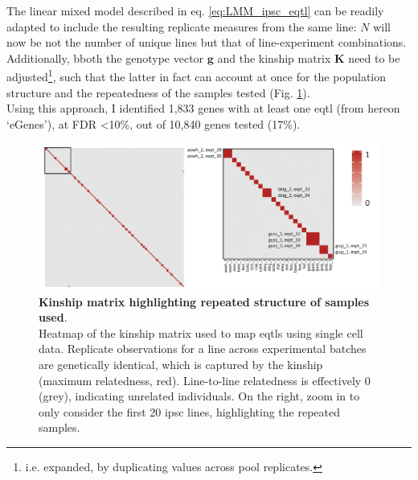 
The linear mixed model described in eq. \eqref{eq:LMM_ipsc_eqtl} can be readily adapted to include the resulting replicate measures from the same line: $N$ will now be not the number of unique lines but that of line-experiment combinations.
Additionally, bboth the genotype vector $\mathbf{g}$ and the kinship matrix $\mathbf{K}$ need to be adjusted\footnote{i.e. expanded, by duplicating values across pool replicates.}, such that the latter in fact can account at once for the population structure and the repeatedness of the samples tested (Fig. \ref{fig:kinship_repeats}). \\

Using this approach, I identified 1,833 genes with at least one \gls{eqtl} (from hereon `eGenes'), at FDR <10\%, out of 10,840 genes tested (17\%). 

\begin{figure}[h]
\centering
\includegraphics[width=14.5cm]{Chapter3/Fig/kinship_repeatedness.png}
\caption[Kinship for repeated samples]{\textbf{Kinship matrix highlighting repeated structure of samples used}.\\
Heatmap of the kinship matrix used to map \glspl{eqtl} using single cell data.
Replicate observations for a line across experimental batches are genetically identical, which is captured by the kinship (maximum relatedness, red).
Line-to-line relatedness is effectively 0 (grey), indicating unrelated individuals. 
On the right, zoom in to only consider the first 20 \gls{ipsc} lines, highlighting the repeated samples.}
\label{fig:kinship_repeats}
\end{figure}

